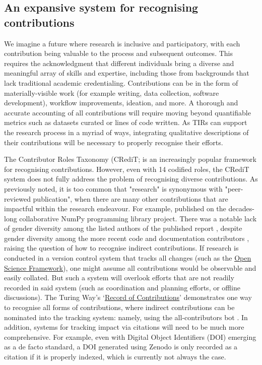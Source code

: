 \documentclass[authordate,meta]{jote-new-article}
\begin{document}
\subsection{An expansive system for recognising contributions}



We imagine a future where research is inclusive and participatory, with each contribution being valuable to the process and subsequent outcomes. This requires the acknowledgment that different individuals bring a diverse and meaningful array of skills and expertise, including those from backgrounds that lack traditional academic credentialing. Contributions can be in the form of materially-visible work (for example writing, data collection, software development), workflow improvements, ideation, and more. A thorough and accurate accounting of all contributions will require moving beyond quantifiable metrics such as datasets curated or lines of code written. As TIRs can support the research process in a myriad of ways, integrating qualitative descriptions of their contributions will be necessary to properly recognise their efforts.



The Contributor Roles Taxonomy (CRediT; \parencites{Brand2015} is an increasingly popular framework for recognising contributions. However, even with 14 codified roles, the CRediT system does not fully address the problem of recognising diverse contributions. As previously noted, it is too common that "research" is synonymous with "peer-reviewed publication", when there are many other contributions that are impactful within the research endeavour. For example,  \textcites{Harris2020} published on the decades-long collaborative NumPy programming library project. There was a notable lack of gender diversity among the listed authors of the published report \parencites{Gallant2022}, despite gender diversity among the more recent code and documentation contributors \parencites{WeberMendonça2020}, raising the question of how to recognise indirect contributions. If research is conducted in a version control system that tracks all changes (such as the \href{https://osf.io}{\underline{Open Science Framework}}), one might assume all contributions would be observable and easily collated. But such a system will overlook efforts that are not readily recorded in said system (such as coordination and planning efforts, or offline discussions). The Turing Way's ‘\href{https://the-turing-way.netlify.app/afterword/contributors-record.html}{\underline{Record of Contributions}}' \parencites{TheTuringWayCommunityRecord2022} demonstrates one way to recognise all forms of contributions, where indirect contributions can be nominated into the tracking system: namely, using the all-contributors bot \parencites{Allall_2022}. In addition, systems for tracking impact via citations will need to be much more comprehensive. For example, even with Digital Object Identifiers (DOI) emerging as a de facto standard, a DOI generated using Zenodo is only recorded as a citation if it is properly indexed, which is currently not always the case.
\end{document}
